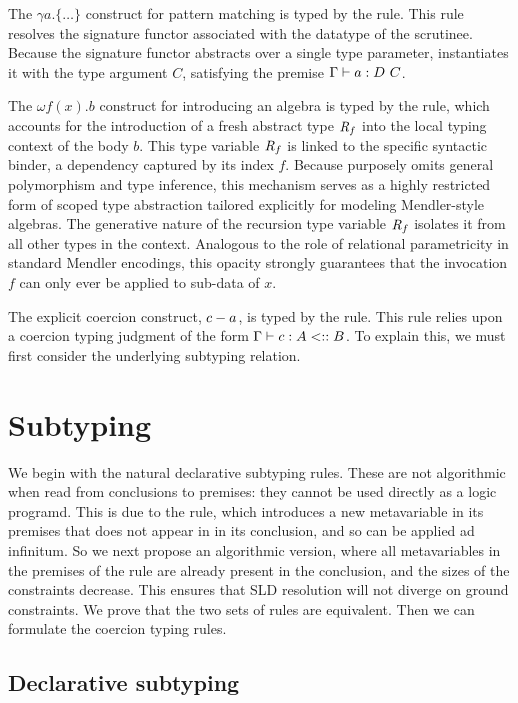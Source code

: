 \documentclass[runningheads]{llncs}
\begin{document}
The $\gamma a . \{ \dots \}$ construct for pattern matching is typed by the  rule.
This rule resolves the signature functor associated with the datatype of the scrutinee.
Because the signature functor abstracts over a single type parameter,  instantiates it with the type argument $C$, satisfying the premise $\Gamma \vdash a : D ~ C$.

The $\omega f(x) . b$ construct for introducing an algebra is typed by the  rule, which accounts for the introduction of a fresh abstract type $\textit{R}_{f}$ into the local typing context of the body $b$.
This type variable $\textit{R}_{f}$ is linked to the specific syntactic binder, a dependency captured by its index $f$.
Because \lcata purposely omits general polymorphism and type inference, this mechanism serves as a highly restricted form of scoped type abstraction tailored explicitly for modeling Mendler-style algebras.
The generative nature of the recursion type variable $\textit{R}_{f}$ isolates it from all other types in the context.
Analogous to the role of relational parametricity in standard Mendler encodings, this opacity strongly guarantees that the invocation $f$ can only ever be applied to sub-data of $x$.

The explicit coercion construct, $c - a$, is typed by the  rule.
This rule relies upon a coercion typing judgment of the form $\Gamma \vdash c : A \mathrel{<::} B$.  To explain this,
we must first consider the underlying subtyping relation.

\section{Subtyping} %
\label{sec:subtyping}

We begin with the natural declarative subtyping rules.  These are not
algorithmic when read from conclusions to premises: they cannot be
used directly as a logic programd. This is due to the 
rule, which introduces a new metavariable in its premises that does
not appear in in its conclusion, and so can be applied ad infinitum.
So we next propose an algorithmic version, where all metavariables in
the premises of the rule are already present in the conclusion, and
the sizes of the constraints decrease.  This ensures that SLD
resolution will not diverge on ground constraints.  We prove that the
two sets of rules are equivalent.  Then we can formulate the coercion
typing rules.

\subsection{Declarative subtyping}
\end{document}
